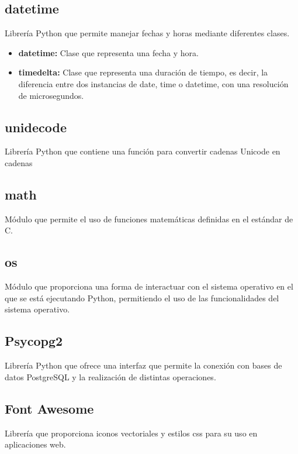 \subsection{datetime}
\cite{datetime} Librería Python que permite manejar fechas y horas mediante diferentes clases.

\begin{itemize}
    \item \textbf{datetime:} Clase que representa una fecha y hora.
    \item \textbf{timedelta:} Clase que representa una duración de tiempo, es decir, la diferencia entre dos instancias de date, time o datetime, con una resolución de microsegundos.
\end{itemize}

\subsection{unidecode}
\cite{unidecode} Librería Python que contiene una función para convertir cadenas Unicode en cadenas 

\subsection{math}
\cite{math} Módulo que permite el uso de funciones matemáticas definidas en el estándar de C.

\subsection{os}
\cite{os} Módulo que proporciona una forma de interactuar con el sistema operativo en el que se está ejecutando Python, permitiendo el uso de las funcionalidades del sistema operativo.

\subsection{Psycopg2}
\cite{psycopg2} Librería Python que ofrece una interfaz que permite la conexión con bases de datos PostgreSQL y la realización de distintas operaciones.

\subsection{Font Awesome}
\cite{font} Librería que proporciona iconos vectoriales y estilos css para su uso en aplicaciones web.